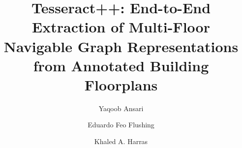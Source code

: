 \documentclass[manuscript,screen,review]{acmart}
\begin{document}
\title[Tesseract++: Multi-Floor Navigable Graphs from Annotated Floorplans]{%
Tesseract++: End-to-End Extraction of Multi-Floor Navigable Graph Representations from Annotated Building Floorplans}

\author{Yaqoob Ansari}

\author{Eduardo Feo Flushing}

\author{Khaled A. Harras}

\renewcommand{\shortauthors}{Ansari et al.}
\end{document}
